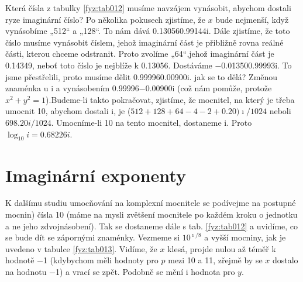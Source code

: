     Která čísla z tabulky \ref{fyz:tab012} musíme navzájem vynásobit, abychom dostali ryze
    imaginární číslo? Po několika pokusech zjistíme, že \(x\) bude nejmenší, když vynásobíme
    „\num{512}“ a „\num{128}“. To nám dává \num{0.13056+0.99144i}. Dále zjistíme, že toto číslo
    musíme vynásobit číslem, jehož imaginární část je přibližně rovna reálné části, kterou chceme
    odstranit. Proto zvolíme „\num{64}“,jehož imaginární část je \num{0.14349}, neboť toto číslo je
    nejblíže k \num{0.13056}. Dostáváme \num{-0.01350+0.99993i}. To jsme přestřelili, proto musíme
    dělit \num{0.99996+0.00900i}. jak se to dělá? Změnou znaménka u \num{i} a vynásobením
    \num{0.99996-0.00900i} (což nám pomůže, protože \(x^2 + y^2 =1\)).Budeme-li takto pokračovat,
    zjistíme, že mocnitel, na který je třeba umocnit \num{10}, abychom dostali \num{i}, je
    (\(\num{512}+\num{128}+\num{64}-\num{4}-\num{2}+\num{0.20})\imath/1024\) neboli
    \(\num{698.20i}/1024\). Umocníme-li \num{10} na tento mocnitel, dostaneme \num{i}. Proto
    \(\log_{10}\num{i} = \num{0.68226i}\).

  \section{Imaginární exponenty}\label{fyz:IchapXXIIsecVI}
    K dalšímu studiu umocňování na komplexní mocnitele se podívejme na postupné mocnin) čísla
    \num{10} (máme na mysli zvětšení mocnitele po každém kroku o jednotku a ne jeho zdvojnásobení).
    Tak se dostaneme dále s tab. \ref {fyz:tab012} a uvidíme, co se bude dít se zápornými znaménky.
    Vezmeme si \(10^{\imath/8}\) a vyšší mocniny, jak je uvedeno v tabulce \ref {fyz:tab013}.
    Vidíme, že \(x\) klesá, projde nulou až téměř k hodnotě \num{-1} (kdybychom měli hodnoty pro
    \(p\) mezi \num{10} a \num{11}, zřejmě by se \(x\) dostalo na hodnotu \num{-1}) a vrací se zpět.
    Podobně se mění i hodnota pro \(y\).

